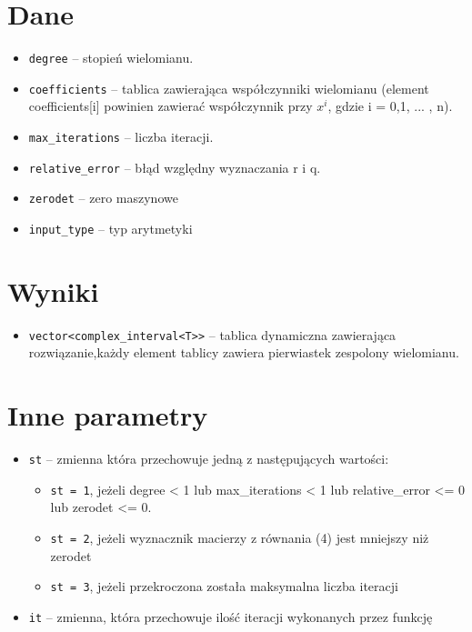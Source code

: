 \documentclass[12pt,a4paper]{article}
\begin{document}
	\section{Dane}
	\begin{itemize}
		\item \texttt{degree} -- stopień wielomianu.
		\item \texttt{coefficients} -- tablica zawierająca współczynniki wielomianu (element coefficients[i] powinien zawierać współczynnik przy $x^{i}$, gdzie i = 0,1, ... , n).
		\item \texttt{max\_iterations} -- liczba iteracji.
		\item \texttt{relative\_error} -- błąd względny wyznaczania r i q.
		\item \texttt{zerodet} -- zero maszynowe
		\item \texttt{input\_type} -- typ arytmetyki
	\end{itemize}
	
	\section{Wyniki}
	\begin{itemize}
		\item \texttt{vector<complex\_interval<T>>} -- tablica dynamiczna zawierająca rozwiązanie,każdy element tablicy zawiera pierwiastek zespolony wielomianu.
	\end{itemize}

	\section{Inne parametry}
	\begin{itemize}
		\item \texttt{st} -- zmienna która przechowuje jedną z następujących wartości:
		\begin{itemize}
			\item \texttt{st = 1}, jeżeli degree < 1 lub max\_iterations < 1 lub relative\_error <= 0 lub zerodet <= 0.
		\end{itemize}
	
		\begin{itemize}
			\item \texttt{st = 2}, jeżeli wyznacznik macierzy z równania (4) jest mniejszy niż zerodet
		\end{itemize}
	
		\begin{itemize}
			\item \texttt{st = 3}, jeżeli przekroczona została maksymalna liczba iteracji
		\end{itemize}
	
	\item \texttt{it} -- zmienna, która przechowuje ilość iteracji wykonanych przez funkcję
	
	
	
	
	\end{itemize}
\end{document}
